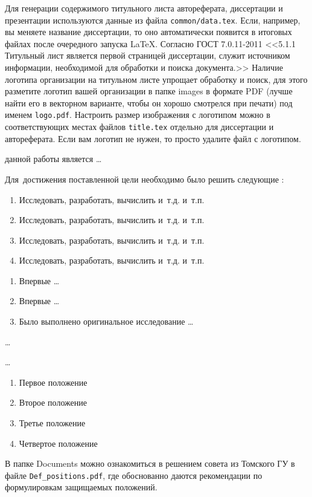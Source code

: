 Для генерации содержимого титульного листа автореферата, диссертации и
презентации используются данные из файла \verb!common/data.tex!. Если,
например, вы меняете название диссертации, то оно автоматически
появится в итоговых файлах после очередного запуска \LaTeX. Согласно
ГОСТ 7.0.11-2011 <<5.1.1 Титульный лист является первой страницей
диссертации, служит источником информации, необходимой для обработки и
поиска документа.>> Наличие логотипа организации на титульном листе
упрощает обработку и поиск, для этого разметите логотип вашей
организации в папке images в формате PDF (лучше найти его в векторном
варианте, чтобы он хорошо смотрелся при печати) под именем
\verb!logo.pdf!. Настроить размер изображения с логотипом можно в
соответствующих местах файлов \verb!title.tex!  отдельно для
диссертации и автореферата. Если вам логотип не нужен, то просто
удалите файл с логотипом.


{\aim} данной работы является \ldots

Для~достижения поставленной цели необходимо было решить следующие {\tasks}:
\begin{enumerate}
  \item Исследовать, разработать, вычислить и~т.\:д. и~т.\:п.
  \item Исследовать, разработать, вычислить и~т.\:д. и~т.\:п.
  \item Исследовать, разработать, вычислить и~т.\:д. и~т.\:п.
  \item Исследовать, разработать, вычислить и~т.\:д. и~т.\:п.
\end{enumerate}


{\novelty}
\begin{enumerate}
  \item Впервые \ldots
  \item Впервые \ldots
  \item Было выполнено оригинальное исследование \ldots
\end{enumerate}

{\influence} \ldots

{\methods} \ldots

{}
\begin{enumerate}
  \item Первое положение
  \item Второе положение
  \item Третье положение
  \item Четвертое положение
\end{enumerate}
В папке Documents можно ознакомиться в решением совета из Томского ГУ
в файле \verb+Def_positions.pdf+, где обоснованно даются рекомендации
по формулировкам защищаемых положений. 


